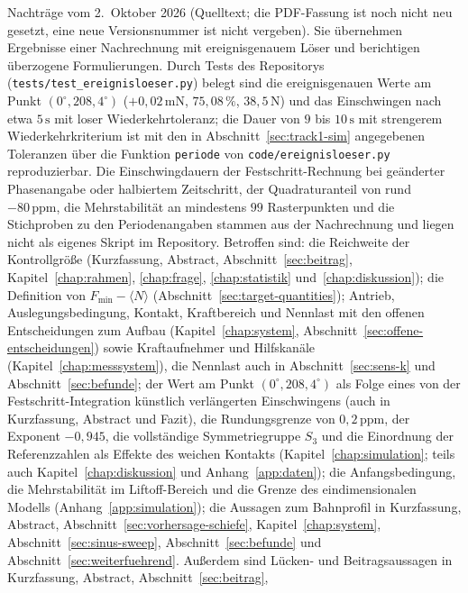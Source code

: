 \documentclass[12pt,a4paper]{report}
\begin{document}
Nachträge vom 2.~Oktober 2026 (Quelltext; die PDF-Fassung ist noch nicht
neu gesetzt, eine neue Versionsnummer ist nicht vergeben). Sie
übernehmen Ergebnisse einer Nachrechnung mit ereignisgenauem Löser und
berichtigen überzogene Formulierungen. Durch Tests des Repositorys
(\texttt{tests/test\_ereignisloeser.py}) belegt sind die ereignisgenauen
Werte am Punkt $(0^\circ, 208{,}4^\circ)$ ($+0{,}02\,\mathrm{mN}$,
$75{,}08\,\%$, $38{,}5\,\mathrm{N}$) und das Einschwingen nach etwa
$5\,\mathrm{s}$ mit loser Wiederkehrtoleranz; die Dauer von $9$ bis
$10\,\mathrm{s}$ mit strengerem Wiederkehrkriterium ist mit den in
Abschnitt~\ref{sec:track1-sim} angegebenen Toleranzen über die Funktion
\texttt{periode} von \texttt{code/ereignisloeser.py} reproduzierbar. Die
Einschwingdauern der Festschritt-Rechnung bei geänderter Phasenangabe
oder halbiertem Zeitschritt, der Quadraturanteil von rund
$-80\,\mathrm{ppm}$, die
Mehrstabilität an mindestens $99$ Rasterpunkten und die Stichproben zu
den Periodenangaben stammen aus der Nachrechnung und liegen nicht als
eigenes Skript im Repository. Betroffen sind: die Reichweite der
Kontrollgröße (Kurzfassung, Abstract, Abschnitt~\ref{sec:beitrag},
Kapitel~\ref{chap:rahmen}, \ref{chap:frage}, \ref{chap:statistik}
und~\ref{chap:diskussion}); die Definition von
$F_{\min} - \langle N \rangle$ (Abschnitt~\ref{sec:target-quantities});
Antrieb, Auslegungsbedingung, Kontakt, Kraftbereich und Nennlast mit den
offenen Entscheidungen zum Aufbau (Kapitel~\ref{chap:system},
Abschnitt~\ref{sec:offene-entscheidungen}) sowie Kraftaufnehmer und
Hilfskanäle (Kapitel~\ref{chap:messsystem}), die Nennlast auch in
Abschnitt~\ref{sec:sens-k} und Abschnitt~\ref{sec:befunde}; der Wert am Punkt
$(0^\circ, 208{,}4^\circ)$ als Folge eines von der Festschritt-Integration
künstlich verlängerten Einschwingens (auch in Kurzfassung, Abstract und
Fazit), die
Rundungsgrenze von $0{,}2\,\mathrm{ppm}$, der Exponent $-0{,}945$, die
vollständige Symmetriegruppe $S_3$ und die Einordnung der Referenzzahlen
als Effekte des weichen Kontakts (Kapitel~\ref{chap:simulation}; teils
auch Kapitel~\ref{chap:diskussion} und Anhang~\ref{app:daten}); die
Anfangsbedingung, die Mehrstabilität im Liftoff-Bereich und die Grenze des
eindimensionalen Modells (Anhang~\ref{app:simulation}); die Aussagen zum
Bahnprofil in Kurzfassung, Abstract, Abschnitt~\ref{sec:vorhersage-schiefe},
Kapitel~\ref{chap:system}, Abschnitt~\ref{sec:sinus-sweep},
Abschnitt~\ref{sec:befunde} und Abschnitt~\ref{sec:weiterfuehrend}.
Außerdem sind Lücken- und Beitragsaussagen
in Kurzfassung, Abstract, Abschnitt~\ref{sec:beitrag},
\end{document}
